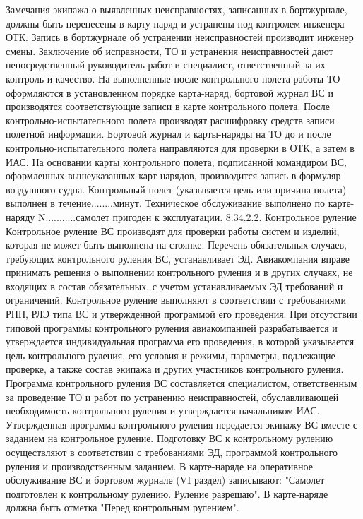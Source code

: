 Замечания экипажа о выявленных неисправностях, записанных в бортжурнале, должны быть перенесены в карту-наряд и устранены под контролем инженера ОТК. Запись в бортжурнале об устранении неисправностей производит инженер смены. Заключение об исправности, ТО и устранения неисправностей дают непосредственный руководитель работ и специалист, ответственный за их контроль и качество.
На выполненные после контрольного полета работы ТО оформляются в установленном порядке карта-наряд, бортовой журнал ВС и производятся соответствующие записи в карте контрольного полета. После контрольно-испытательного полета производят расшифровку средств записи полетной информации.
Бортовой журнал и карты-наряды на ТО до и после контрольно-испытательного полета направляются для проверки в ОТК, а затем в ИАС. На основании карты контрольного полета, подписанной командиром ВС, оформленных вышеуказанных карт-нарядов, производится запись в формуляр воздушного судна.
Контрольный полет (указывается цель или причина полета) выполнен в течение........минут. Техническое обслуживание выполнено по карте-наряду N...........самолет пригоден к эксплуатации.
8.34.2.2.	Контрольное руление
Контрольное руление ВС производят для проверки работы систем и изделий, которая не может быть выполнена на стоянке.
Перечень обязательных случаев, требующих контрольного руления ВС, устанавливает ЭД.
Авиакомпания вправе принимать решения о выполнении контрольного руления и в других случаях, не входящих в состав обязательных, с учетом устанавливаемых ЭД требований и ограничений.
Контрольное руление выполняют в соответствии с требованиями РПП, РЛЭ типа ВС и утвержденной программой его проведения.
При отсутствии типовой программы контрольного руления авиакомпанией разрабатывается и утверждается индивидуальная программа его проведения, в которой указывается цель контрольного руления, его условия и режимы, параметры, подлежащие проверке, а также состав экипажа и других участников контрольного руления.
Программа контрольного руления ВС составляется специалистом, ответственным за проведение ТО и работ по устранению неисправностей, обуславливающей необходимость контрольного руления и утверждается начальником ИАС.
Утвержденная программа контрольного руления передается экипажу ВС вместе с заданием на контрольное руление.
 Подготовку ВС к контрольному рулению осуществляют в соответствии с требованиями ЭД, программой контрольного руления и производственным заданием. В карте-наряде на оперативное обслуживание ВС и бортовом журнале (VI раздел) записывают: "Самолет подготовлен к контрольному рулению. Руление разрешаю".
В карте-наряде должна быть отметка "Перед контрольным рулением".

